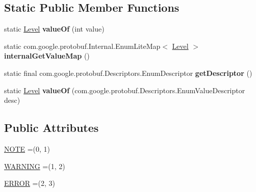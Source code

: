 \subsection*{Static Public Member Functions}
\begin{DoxyCompactItemize}
\item 
\mbox{\label{enumcom_1_1mysql_1_1cj_1_1x_1_1protobuf_1_1_mysqlx_notice_1_1_warning_1_1_level_a0490897768e5bbc1407d9f46cb77d011}} 
static \mbox{\hyperlink{enumcom_1_1mysql_1_1cj_1_1x_1_1protobuf_1_1_mysqlx_notice_1_1_warning_1_1_level}{Level}} {\bfseries value\+Of} (int value)
\item 
\mbox{\label{enumcom_1_1mysql_1_1cj_1_1x_1_1protobuf_1_1_mysqlx_notice_1_1_warning_1_1_level_a5112b45ae6899cc4bcb307f127b3e784}} 
static com.\+google.\+protobuf.\+Internal.\+Enum\+Lite\+Map$<$ \mbox{\hyperlink{enumcom_1_1mysql_1_1cj_1_1x_1_1protobuf_1_1_mysqlx_notice_1_1_warning_1_1_level}{Level}} $>$ {\bfseries internal\+Get\+Value\+Map} ()
\item 
\mbox{\label{enumcom_1_1mysql_1_1cj_1_1x_1_1protobuf_1_1_mysqlx_notice_1_1_warning_1_1_level_aec392f8349f8ef7b775b76921c54af4a}} 
static final com.\+google.\+protobuf.\+Descriptors.\+Enum\+Descriptor {\bfseries get\+Descriptor} ()
\item 
\mbox{\label{enumcom_1_1mysql_1_1cj_1_1x_1_1protobuf_1_1_mysqlx_notice_1_1_warning_1_1_level_a10cc5f6905869382f00bf8d5cafc2f46}} 
static \mbox{\hyperlink{enumcom_1_1mysql_1_1cj_1_1x_1_1protobuf_1_1_mysqlx_notice_1_1_warning_1_1_level}{Level}} {\bfseries value\+Of} (com.\+google.\+protobuf.\+Descriptors.\+Enum\+Value\+Descriptor desc)
\end{DoxyCompactItemize}
\subsection*{Public Attributes}
\begin{DoxyCompactItemize}
\item 
\mbox{\hyperlink{enumcom_1_1mysql_1_1cj_1_1x_1_1protobuf_1_1_mysqlx_notice_1_1_warning_1_1_level_ac2667c96d72322268a45472daccdf93c}{N\+O\+TE}} =(0, 1)
\item 
\mbox{\hyperlink{enumcom_1_1mysql_1_1cj_1_1x_1_1protobuf_1_1_mysqlx_notice_1_1_warning_1_1_level_a340b65b4419690da8e8e593c54f7e46f}{W\+A\+R\+N\+I\+NG}} =(1, 2)
\item 
\mbox{\hyperlink{enumcom_1_1mysql_1_1cj_1_1x_1_1protobuf_1_1_mysqlx_notice_1_1_warning_1_1_level_ad98493bcee681b36788be787714329f9}{E\+R\+R\+OR}} =(2, 3)
\end{DoxyCompactItemize}
